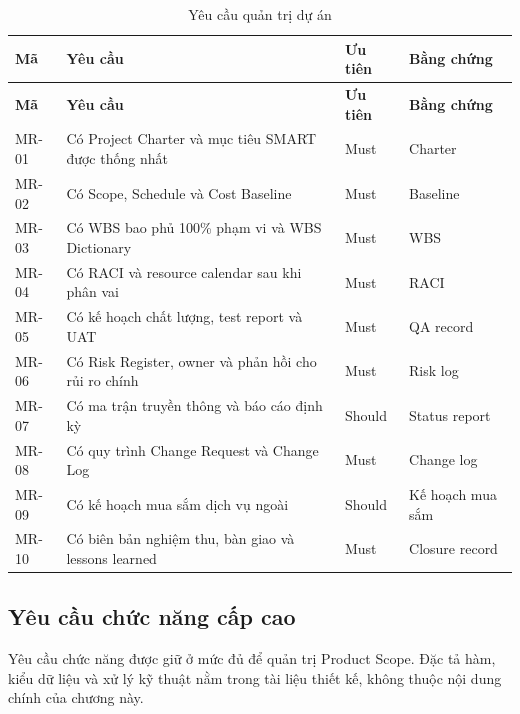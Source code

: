 \begin{longtable}{| p{1.2cm} | p{7.4cm} | p{2.1cm} | p{2.1cm} |}
\caption{Yêu cầu quản trị dự án}\label{tab:management-requirements}\\
\hline
\textbf{Mã} & \textbf{Yêu cầu} & \textbf{Ưu tiên} & \textbf{Bằng chứng} \\
\hline
\endfirsthead
\hline
\textbf{Mã} & \textbf{Yêu cầu} & \textbf{Ưu tiên} & \textbf{Bằng chứng} \\
\hline
\endhead
MR-01 & Có Project Charter và mục tiêu SMART được thống nhất & Must & Charter \\ \hline
MR-02 & Có Scope, Schedule và Cost Baseline & Must & Baseline \\ \hline
MR-03 & Có WBS bao phủ 100\% phạm vi và WBS Dictionary & Must & WBS \\ \hline
MR-04 & Có RACI và resource calendar sau khi phân vai & Must & RACI \\ \hline
MR-05 & Có kế hoạch chất lượng, test report và UAT & Must & QA record \\ \hline
MR-06 & Có Risk Register, owner và phản hồi cho rủi ro chính & Must & Risk log \\ \hline
MR-07 & Có ma trận truyền thông và báo cáo định kỳ & Should & Status report \\ \hline
MR-08 & Có quy trình Change Request và Change Log & Must & Change log \\ \hline
MR-09 & Có kế hoạch mua sắm dịch vụ ngoài & Should & Kế hoạch mua sắm \\ \hline
MR-10 & Có biên bản nghiệm thu, bàn giao và lessons learned & Must & Closure record \\
\hline
\end{longtable}

\subsection{Yêu cầu chức năng cấp cao}

Yêu cầu chức năng được giữ ở mức đủ để quản trị Product Scope. Đặc tả hàm, kiểu dữ liệu và xử lý kỹ thuật nằm trong tài liệu thiết kế, không thuộc nội dung chính của chương này.


